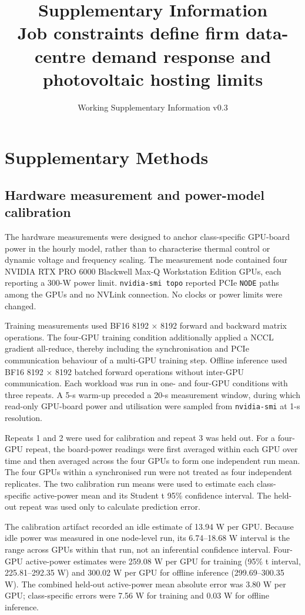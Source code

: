 \documentclass[10pt,a4paper]{article}
\title{\sffamily\bfseries Supplementary Information\\[0.8em]\Large Job constraints define firm data-centre demand response and photovoltaic hosting limits}
\author{\sffamily [AUTHOR NAMES]}
\date{Working Supplementary Information v0.3}
\begin{document}
\maketitle
\thispagestyle{fancy}
\clearpage
\tableofcontents
\clearpage
\section{Supplementary Methods}

\subsection{Hardware measurement and power-model calibration}

The hardware measurements were designed to anchor class-specific GPU-board power in the hourly model, rather than to characterise thermal control or dynamic voltage and frequency scaling. The measurement node contained four NVIDIA RTX PRO 6000 Blackwell Max-Q Workstation Edition GPUs, each reporting a 300-W power limit. \nolinkurl{nvidia-smi topo} reported PCIe \nolinkurl{NODE} paths among the GPUs and no NVLink connection. No clocks or power limits were changed.


Training measurements used BF16 8192 × 8192 forward and backward matrix operations. The four-GPU training condition additionally applied a NCCL gradient all-reduce, thereby including the synchronisation and PCIe communication behaviour of a multi-GPU training step. Offline inference used BF16 8192 × 8192 batched forward operations without inter-GPU communication. Each workload was run in one- and four-GPU conditions with three repeats. A 5-s warm-up preceded a 20-s measurement window, during which read-only GPU-board power and utilisation were sampled from \nolinkurl{nvidia-smi} at 1-s resolution.


Repeats 1 and 2 were used for calibration and repeat 3 was held out. For a four-GPU repeat, the board-power readings were first averaged within each GPU over time and then averaged across the four GPUs to form one independent run mean. The four GPUs within a synchronised run were not treated as four independent replicates. The two calibration run means were used to estimate each class-specific active-power mean and its Student t 95\% confidence interval. The held-out repeat was used only to calculate prediction error.


The calibration artifact recorded an idle estimate of 13.94 W per GPU. Because idle power was measured in one node-level run, its 6.74–18.68 W interval is the range across GPUs within that run, not an inferential confidence interval. Four-GPU active-power estimates were 259.08 W per GPU for training (95\% t interval, 225.81–292.35 W) and 300.02 W per GPU for offline inference (299.69–300.35 W). The combined held-out active-power mean absolute error was 3.80 W per GPU; class-specific errors were 7.56 W for training and 0.03 W for offline inference.
\end{document}
